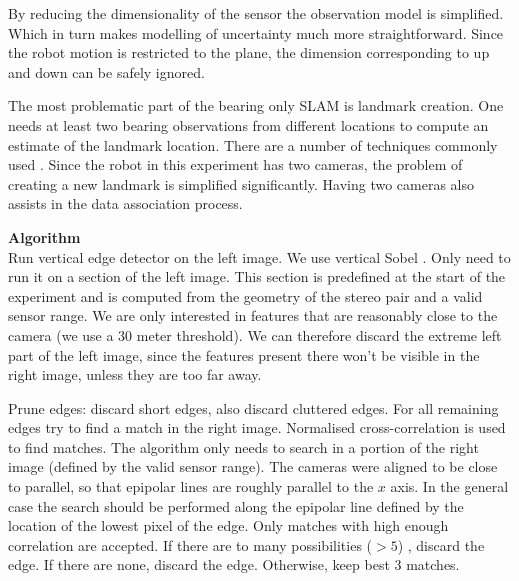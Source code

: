 By reducing the dimensionality of the sensor the observation model is
simplified. Which in turn makes modelling of uncertainty much more
straightforward. Since the robot motion is restricted to the plane, the
dimension corresponding to up and down can be safely ignored.

The most problematic part of the bearing only SLAM is landmark
creation. One needs at least two bearing observations from different
locations to compute an estimate of the landmark location. There are a
number of techniques commonly used \cite{bearing_only_slam}. Since the
robot in this experiment has two cameras, the problem of creating a
new landmark is simplified significantly. Having two cameras also
assists in the data association process. 





{\bf Algorithm }\\
Run vertical edge detector on the left image. We use vertical Sobel
\cite{Hartley2004}. Only need to run it on a section of the left
image. This section is predefined at the start of the experiment and
is computed from the geometry of the stereo pair and a valid sensor
range. We are only interested in features that are reasonably
close to the camera (we use a 30 meter threshold). We can therefore
discard the extreme left part of the left image, since the features
present there won't be visible in the right image, unless they are too
far away.

Prune edges: discard short edges, also discard cluttered edges. For
all remaining edges try to find a match in the right image. Normalised
cross-correlation is used to find matches. The algorithm only needs to
search in a portion of the right image (defined by the valid sensor
range). The cameras were aligned to be close to parallel, so that
epipolar lines are roughly parallel to the $x$ axis. In the general
case the search should be performed along the epipolar line defined by
the location of the lowest pixel of the edge. Only matches with high
enough correlation are accepted. If there are to many possibilities
($> 5$) , discard the edge. If there are none, discard the
edge. Otherwise, keep best 3 matches.


